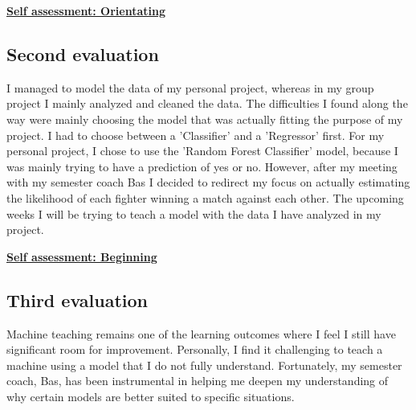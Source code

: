 \documentclass{article}
\begin{document}
  \underline{\textbf{Self assessment: Orientating}}

	\subsection{Second evaluation}
	I managed to model the data of my personal project, whereas in my group project I mainly analyzed and cleaned the data. The difficulties
	I found along the way were mainly choosing the model that was actually fitting the purpose of my project. I had to choose between a 'Classifier'
	and a 'Regressor' first. For my personal project, I chose to use the 'Random Forest Classifier' model, because I was mainly trying to have a 
	prediction of yes or no. However, after my meeting with my semester coach Bas I decided to redirect my focus on actually estimating 
	the likelihood of each fighter winning a match against each other. The upcoming weeks I will be trying to teach a model with the data I have
  analyzed in my project.
	
  \underline{\textbf{Self assessment: Beginning}}
	
	\subsection{Third evaluation}
	Machine teaching remains one of the learning outcomes where I feel I still have significant room for improvement. Personally, I find it challenging to teach a machine using a model that I do not fully understand. Fortunately, my semester coach, Bas, has been instrumental in helping me deepen my understanding of why certain models are better suited to specific situations.\\
	
\end{document}

